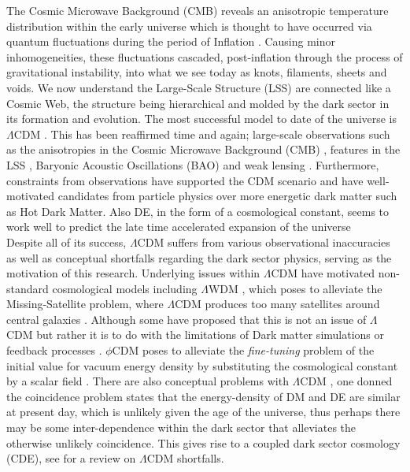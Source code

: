\documentclass[a4paper,fleqn,usenatbib]{mnras}
\def \lcdm{$\Lambda$CDM }
\def \lwdm{$\Lambda$WDM }
\def \qcdm{$\phi$CDM }
\begin{document}
The Cosmic Microwave Background (CMB) reveals an anisotropic temperature distribution within the early universe which is thought to have occurred via quantum fluctuations during the period of Inflation \citep{Guth_82}. Causing minor inhomogeneities, these fluctuations cascaded, post-inflation through the process of gravitational instability, into what we see today as knots, filaments, sheets and voids. We now understand the Large-Scale Structure (LSS) are connected like a Cosmic Web, the structure being hierarchical and molded by the dark sector in its formation and evolution. The most successful model to date of the universe is \lcdm. This has been reaffirmed time and again; large-scale observations such as the anisotropies in the Cosmic Microwave Background (CMB) \citep{Bennett_13,Plank_14b,Plank_16}, features in the LSS \citep{Abazajian_09}, Baryonic Acoustic Oscillations (BAO) \citep{Beutler_11} and weak lensing \citep{Kilbinger_13}. Furthermore, constraints from observations have supported the CDM scenario \citep{Bertone_05,Petraki_13} and have well-motivated candidates from particle physics over more energetic dark matter such as Hot Dark Matter. Also DE, in the form of a cosmological constant, seems to work well to predict the late time accelerated expansion of the universe \citep{Suzuki_12}
\\
Despite all of its success, \lcdm suffers from various observational inaccuracies as well as conceptual shortfalls regarding the dark sector physics, serving as the motivation of this research. Underlying issues within \lcdm have motivated non-standard cosmological models including \lwdm, which poses to alleviate the Missing-Satellite problem, where \lcdm produces too many satellites around central galaxies \citep{Klypin_99,Moore_99}. Although some have proposed that this is not an issue of \lcdm but rather it is to do with the limitations of Dark matter simulations \citep{Wetzel_16} or feedback processes \citep[e.g][]{Bullock_00}. \qcdm poses to alleviate the \textit{fine-tuning} problem of the initial value for vacuum energy density by substituting the cosmological constant by a scalar field \citep{Tsujikawa_13}. There are also conceptual problems with \lcdm, one donned the coincidence problem states that the energy-density of DM and DE are similar at present day, which is unlikely given the age of the universe, thus perhaps there may be some inter-dependence within the dark sector that alleviates the otherwise unlikely coincidence. This gives rise to a coupled dark sector cosmology (CDE), see \citet{Bull_16} for a review on \lcdm shortfalls. 
\end{document}
